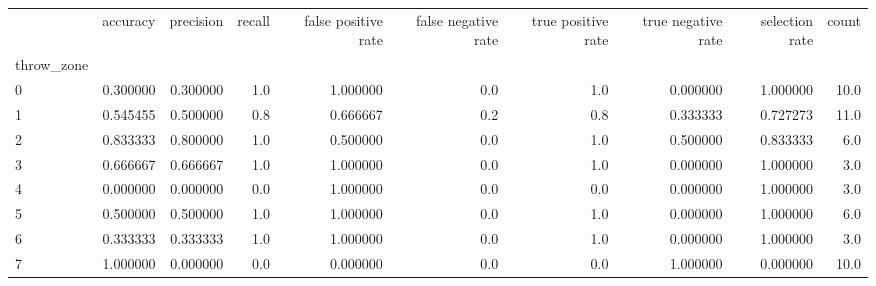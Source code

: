 \begin{tabular}{lrrrrrrrrr}
\toprule
{} &  accuracy &  precision &  recall &  false positive rate &  false negative rate &  true positive rate &  true negative rate &  selection rate &  count \\
throw\_zone &           &            &         &                      &                      &                     &                     &                 &        \\
\midrule
0          &  0.300000 &   0.300000 &     1.0 &             1.000000 &                  0.0 &                 1.0 &            0.000000 &        1.000000 &   10.0 \\
1          &  0.545455 &   0.500000 &     0.8 &             0.666667 &                  0.2 &                 0.8 &            0.333333 &        0.727273 &   11.0 \\
2          &  0.833333 &   0.800000 &     1.0 &             0.500000 &                  0.0 &                 1.0 &            0.500000 &        0.833333 &    6.0 \\
3          &  0.666667 &   0.666667 &     1.0 &             1.000000 &                  0.0 &                 1.0 &            0.000000 &        1.000000 &    3.0 \\
4          &  0.000000 &   0.000000 &     0.0 &             1.000000 &                  0.0 &                 0.0 &            0.000000 &        1.000000 &    3.0 \\
5          &  0.500000 &   0.500000 &     1.0 &             1.000000 &                  0.0 &                 1.0 &            0.000000 &        1.000000 &    6.0 \\
6          &  0.333333 &   0.333333 &     1.0 &             1.000000 &                  0.0 &                 1.0 &            0.000000 &        1.000000 &    3.0 \\
7          &  1.000000 &   0.000000 &     0.0 &             0.000000 &                  0.0 &                 0.0 &            1.000000 &        0.000000 &   10.0 \\
\bottomrule
\end{tabular}

